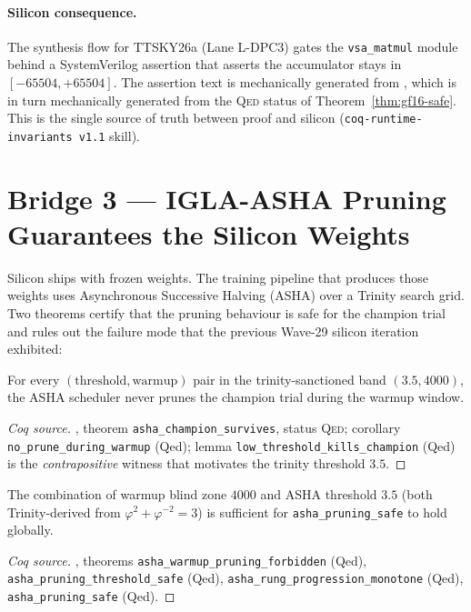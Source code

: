 \paragraph{Silicon consequence.}
The synthesis flow for TTSKY26a (Lane L-DPC3) gates the \texttt{vsa\_matmul}
module behind a SystemVerilog assertion that asserts the accumulator stays
in $[-65504, +65504]$.
The assertion text is mechanically generated from
, which is in turn mechanically
generated from the \textsc{Qed} status of Theorem~\ref{thm:gf16-safe}.
This is the single source of truth between proof and silicon
(\texttt{coq-runtime-invariants v1.1} skill).

\section{Bridge 3 --- IGLA-ASHA Pruning Guarantees the Silicon Weights}

Silicon ships with frozen weights. The training pipeline that produces
those weights uses Asynchronous Successive Halving (ASHA) over a Trinity
search grid. Two theorems certify that the pruning behaviour is
safe for the champion trial and rules out the failure mode that the
previous Wave-29 silicon iteration exhibited:

\begin{theorem}
\label{thm:asha-survive}
For every $(\text{threshold}, \text{warmup})$ pair in the trinity-sanctioned
band $(3.5, 4000)$, the ASHA scheduler never prunes the champion trial
during the warmup window.
\end{theorem}
\begin{proof}[Coq source]
, theorem
\texttt{asha\_champion\_survives}, status \textsc{Qed};
corollary \texttt{no\_prune\_during\_warmup} (Qed);
lemma \texttt{low\_threshold\_kills\_champion} (Qed) is the
\emph{contrapositive} witness that motivates the trinity threshold $3.5$.
\end{proof}

\begin{theorem}
\label{thm:asha-safe}
The combination of warmup blind zone $4000$ and ASHA threshold $3.5$
(both Trinity-derived from $\varphi^2 + \varphi^{-2} = 3$) is sufficient
for \texttt{asha\_pruning\_safe} to hold globally.
\end{theorem}
\begin{proof}[Coq source]
, theorems
\texttt{asha\_warmup\_pruning\_forbidden} (Qed),
\texttt{asha\_pruning\_threshold\_safe} (Qed),
\texttt{asha\_rung\_progression\_monotone} (Qed),
\texttt{asha\_pruning\_safe} (Qed).
\end{proof}

